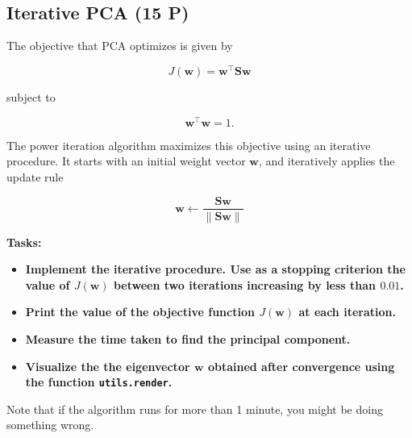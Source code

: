 \documentclass[11pt]{article}
\providecommand{\tightlist}{%
      \setlength{\itemsep}{0pt}\setlength{\parskip}{0pt}}
\begin{document}
    \begin{center}
    \end{center}
    { \hspace*{\fill} \\}
    
    \begin{center}
    \end{center}
    { \hspace*{\fill} \\}
    
    \subsection{Iterative PCA (15 P)}\label{iterative-pca-15-p}

The objective that PCA optimizes is given by

\[
J(\boldsymbol{w}) = \boldsymbol{w}^\top \boldsymbol{S} \boldsymbol{w}
\]

subject to

\[
\boldsymbol{w}^\top \boldsymbol{w} = 1.
\]

The power iteration algorithm maximizes this objective using an
iterative procedure. It starts with an initial weight vector
\(\boldsymbol{w}\), and iteratively applies the update rule

\[
\boldsymbol{w} \leftarrow \frac{\boldsymbol{S} \boldsymbol{w}}{\|\boldsymbol{S} \boldsymbol{w}\|}
\]

\textbf{Tasks:}

\begin{itemize}
\tightlist
\item
  \textbf{Implement the iterative procedure. Use as a stopping criterion
  the value of \(J(\boldsymbol{w})\) between two iterations increasing
  by less than \(0.01\).}
\item
  \textbf{Print the value of the objective function
  \(J(\boldsymbol{w})\) at each iteration.}
\item
  \textbf{Measure the time taken to find the principal component.}
\item
  \textbf{Visualize the the eigenvector \(\boldsymbol{w}\) obtained
  after convergence using the function \texttt{utils.render}.}
\end{itemize}

Note that if the algorithm runs for more than 1 minute, you might be
doing something wrong.
\end{document}
